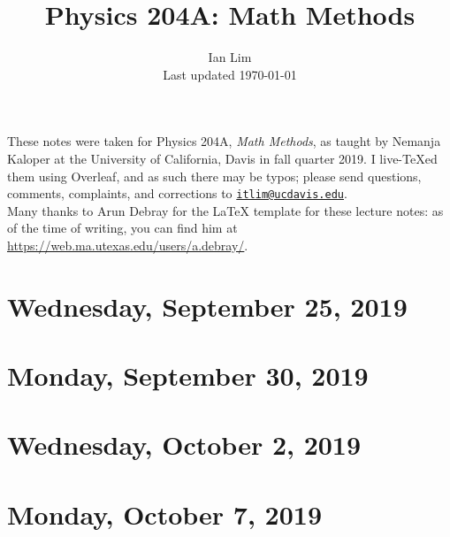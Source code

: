 \documentclass{../mynotes}
\begin{document}
\title{Physics 204A: Math Methods}
\author{Ian Lim\\ Last updated \today}
\maketitle
{\small\noindent These notes were taken for Physics 204A, \emph{Math Methods}, as taught by Nemanja Kaloper at the University of California, Davis in fall quarter 2019. I live-\TeX ed them using Overleaf, and as such there may be typos; please send questions, comments, complaints, and corrections to 
\href{mailto:itlim@ucdavis.edu?subject=204A\%20Lecture\%20Notes}{\texttt{itlim@ucdavis.edu}}.\\
Many thanks to Arun Debray for the {\LaTeX} template for these lecture notes: as of the time of writing, you can find him at \url{https://web.ma.utexas.edu/users/a.debray/}.}

\tableofcontents

\section{Wednesday, September 25, 2019}
	
	

\section{Monday, September 30, 2019}
    
\section{Wednesday, October 2, 2019}
    
    
\section{Monday, October 7, 2019}
	
\end{document}
